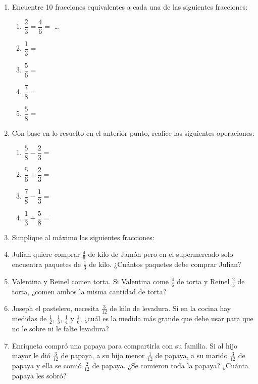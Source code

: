 \documentclass[fleqn]{article}
\begin{document}
\begin{enumerate}
 \item Encuentre 10 fracciones equivalentes a cada una de las siguientes fracciones:
 \begin{enumerate}
 \item $\dfrac{2}{3}=\dfrac{4}{6}=$ \dots
 \item $\dfrac{1}{3}=$
 \item $\dfrac{5}{6}=$
 \item $\dfrac{7}{8}=$
  \item $\dfrac{5}{8}=$
 \end{enumerate}
 \item Con base en lo resuelto en el anterior punto, realice las siguientes operaciones:
 \begin{enumerate}
 \item $\dfrac{5}{8}-\dfrac{2}{3}=$
 \item $\dfrac{5}{6}+\dfrac{2}{3}=$
 \item $\dfrac{7}{8}-\dfrac{1}{3}=$
 \item $\dfrac{1}{3}+\dfrac{5}{8}=$
 \end{enumerate}
 \item Simplique al máximo las siguientes fracciones:
\begin{enumerate}
\end{enumerate}
\item Julian quiere comprar $\frac{4}{6}$ de kilo de Jamón pero en el supermercado solo encuentra  paquetes de $\frac{1}{3}$ de kilo. ¿Cuántos paquetes debe comprar Julian?\noanswer
\item Valentina y Reinel comen torta. Si Valentina come $\frac{4}{6}$ de torta y Reinel $\frac{2}{3}$ de torta, ¿comen ambos la misma cantidad de torta?\noanswer
\item Joseph el pastelero, necesita $\frac{3}{12}$ de kilo de levadura. Si en la cocina hay medidas de $\frac{1}{2}$, $\frac{1}{3}$, $\frac{1}{4}$ y $\frac{1}{6}$, ¿cu\'{a}l es la medida m\'{a}s grande que debe usar para que no le sobre ni le falte levadura?\noanswer
\item Enriqueta compró una papaya para compartirla con su familia. Si al hijo mayor le dió $\frac{3}{12} $ de papaya, a su hijo menor $\frac{1}{12}$ de papaya, a su marido $\frac{3}{12}$ de papaya y ella se comió $\frac{2}{12}$ de papaya. ¿Se comieron toda la papaya? ¿Cuánta papaya les sobró?\noanswer
 \end{enumerate}
\end{document}
